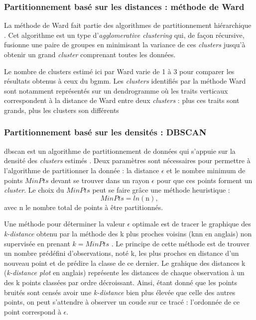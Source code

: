 \subsubsection{Partitionnement basé sur les distances : méthode de Ward}
La méthode de Ward fait partie des algorithmes de partitionnement hiérarchique \citep{Ward1963}. 
Cet algorithme est un type d'\textit{agglomerative clustering} qui, de façon récursive, fusionne une paire de groupes 
en minimisant la variance de ces \textit{clusters} jusqu'à obtenir un grand \textit{cluster} comprenant toutes les données.

Le nombre de clusters estimé ici par Ward varie de 1 à 3 pour comparer les résultats obtenus à ceux du \gls{bgmm}. Les \textit{clusters}
identifiés par la méthode Ward sont notamment représentés sur un dendrogramme où les traits verticaux correspondent à la distance de Ward entre 
deux \textit{clusters} : plus ces traits sont grands, plus les clusters son différents

\subsubsection{Partitionnement basé sur les densités : DBSCAN}
\gls{dbscan} est un algorithme de partitionnement de données qui s'appuie sur la densité des \textit{clusters} estimés \citep{Ester1996}. 
Deux paramètres sont nécessaires pour permettre à l'algorithme de partitionner la donnée : la distance $\epsilon$ et le nombre minimum de points 
$MinPts$ devant se trouver dans un rayon $\epsilon$ pour que ces points forment un \textit{cluster}. 
Le choix du $MinPts$ peut se faire grâce une méthode heuristique :
\begin{equation}
\label{eq:tbr_dbscan}
MinPts = ln(\text{n}),
\end{equation}
avec n le nombre total de points à être partitionnés.

Une méthode pour déterminer la valeur $\epsilon$ optimale est de tracer le graphique des \textit{k-distance} obtenu par la méthode des k plus proches voisins 
(\gls{knn} en anglais) non supervisée en prenant $k = MinPts$ \citep{James2013, Goldberger2005}. Le principe de cette méthode
est de trouver un nombre prédéfini d'observations, noté k, les plus proches en distance d'un nouveau point et de prédire la classe de ce dernier. 
Le grahique des distances k (\textit{k-distance plot} en anglais) représente les distances de chaque observation à un des k points classées par ordre décroissant. 
Ainsi, étant donné que les points bruités sont censés avoir une \textit{k-distance} bien plus élevée que celle des autres points, on peut 
s'attendre à observer un coude sur ce tracé : l'ordonnée de ce point correspond à $\epsilon$.

